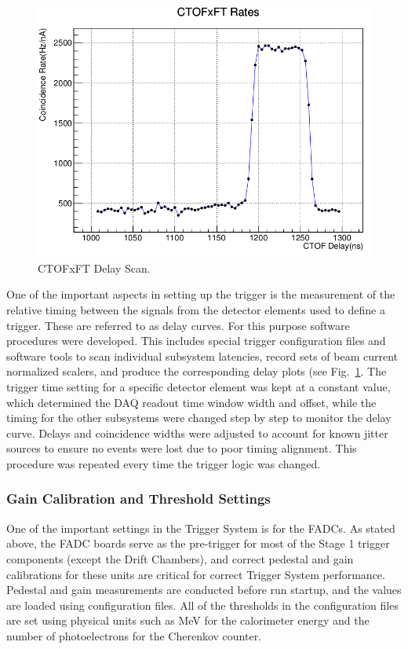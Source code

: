\begin{figure}[hbt]
	\centering
	\includegraphics[width=1.0\columnwidth,keepaspectratio]{img/delay_scan_ctof_ft.png}
	\caption{CTOFxFT Delay Scan.}
	\label{fig:delay_scan_ctof_ft}
\end{figure}

One of the important aspects in setting up the trigger is the measurement of the relative timing between the signals from the detector elements used to define a trigger. These are referred to as delay curves. For this purpose software procedures were developed. This includes special trigger configuration files and software tools to scan individual subsystem latencies, record sets of beam current normalized scalers, and produce the corresponding delay plots (see Fig.~\ref{fig:delay_scan_ctof_ft}. The trigger time setting for a specific detector element was kept at a constant value, which determined the DAQ readout time window width and offset, while the timing for the other subsystems were changed step by step to monitor the delay curve. Delays and coincidence widths were adjusted to account for known jitter sources to ensure no events were lost due to poor timing alignment. This procedure was repeated every time the trigger logic was changed.


\subsubsection{Gain Calibration and Threshold Settings}

One of the important settings in the Trigger System is for the FADCs. As stated above, the FADC boards serve as the pre-trigger for most of the Stage 1 trigger components (except the Drift Chambers), and correct pedestal and gain calibrations for these units are critical for correct Trigger System performance. Pedestal and gain measurements are conducted before run startup, and the values are loaded using configuration files. All of the thresholds in the configuration files are set using physical units such as MeV for the calorimeter energy and the number of photoelectrons for the Cherenkov counter.


